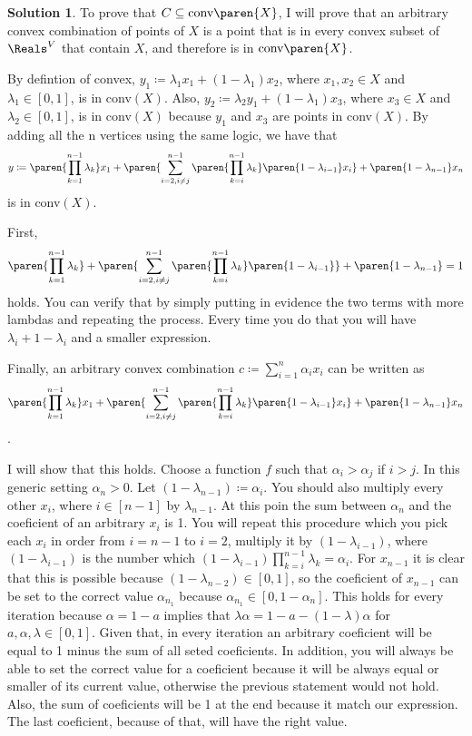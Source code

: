 \documentclass[11pt,leqno,final]{amsart}
\theoremstyle{definition}
\newtheorem{solution}{Solution}
\begin{document}
\begin{solution}
To prove that $C \subseteq \text{conv}\paren{X}$, I will prove that an arbitrary convex combination of points of $X$ is a point that is in every convex subset of $\Reals^{V}$ that contain $X$, and therefore is in $\text{conv}\paren{X}$.

By defintion of convex, $y_{1} \coloneqq \lambda_{1}x_{1} + (1 - \lambda_{1})x_{2}$, where $x_{1}, x_{2} \in X$ and $\lambda_{1} \in [0,1]$, is in conv$(X)$. Also, $y_{2} \coloneqq \lambda_{2}y_{1} + (1 - \lambda_{1})x_{3}$, where $x_{3} \in X$ and $\lambda_{2} \in [0,1]$, is in conv$(X)$ because $y_{1}$ and $x_{3}$ are points in conv$(X)$. By adding all the n vertices using the same logic, we have that $$y \coloneqq \paren{\prod_{k = 1}^{n - 1} \lambda_{k}} x_{1} + \paren{\sum_{i = 2, i \neq j}^{n-1} \paren{\prod_{k = i}^{n-1} \lambda_{k}} \paren{1 - \lambda_{i-1}} x_{i}} + \paren{1 - \lambda_{n-1}} x_{n}$$ is in conv$(X)$.

First, $$\paren{\prod_{k = 1}^{n - 1} \lambda_{k}} + \paren{\sum_{i = 2, i \neq j}^{n-1} \paren{\prod_{k = i}^{n-1} \lambda_{k}} \paren{1 - \lambda_{i-1}}} + \paren{1 - \lambda_{n-1}} = 1$$ holds. You can verify that by simply putting in evidence the two terms with more lambdas and repeating the process. Every time you do that you will have $\lambda_i + 1 - \lambda_i$ and a smaller expression.

Finally, an arbitrary convex combination $c \coloneqq \sum_{i = 1}^{n} \alpha_{i} x_{i}$ can be written as $$\paren{\prod_{k = 1}^{n - 1} \lambda_{k}} x_{1} + \paren{\sum_{i = 2, i \neq j}^{n-1} \paren{\prod_{k = i}^{n-1} \lambda_{k}} \paren{1 - \lambda_{i-1}} x_{i}} + \paren{1 - \lambda_{n-1}} x_{n}$$. 

I will show that this holds. Choose a function $f$ such that $\alpha_{i} > \alpha_{j}$ if $i > j$. In this generic setting $\alpha_{n} > 0$. Let $(1-\lambda_{n-1})\coloneqq \alpha_{i}$. You should also multiply every other $x_i$, where $i \in [n-1]$ by $\lambda_{n-1}$. At this poin the sum between $\alpha_{n}$ and the coeficient of an arbitrary $x_i$ is 1. You will repeat this procedure which you pick each $x_i$ in order from $i = n-1$ to $i = 2$, multiply it by $(1-\lambda_{i-1})$, where $(1-\lambda_{i-1})$ is the number which $(1-\lambda_{i-1})\prod_{k = i}^{n - 1} \lambda_{k} = \alpha_i$. For $x_{n-1}$ it is clear that this is possible because $(1-\lambda_{n-2}) \in [0,1]$, so the coeficient of $x_{n-1}$ can be set to the correct value $\alpha_{n_1}$ because  $\alpha_{n_1} \in [0,1-\alpha_{n}]$. This holds for every iteration because $\alpha = 1 - a$ implies that $\lambda\alpha = 1 - a - (1 - \lambda)\alpha$ for $a,\alpha,\lambda \in [0,1]$. Given that, in every iteration an arbitrary coeficient will be equal to 1 minus the sum of all seted coeficients. In addition, you will always be able to set the correct value for a coeficient because it will be always equal or smaller of its current value, otherwise the previous statement would not hold. Also, the sum of coeficients will be 1 at the end because it match our expression. The last coeficient, because of that, will have the right value. 


\end{solution}
\end{document}
